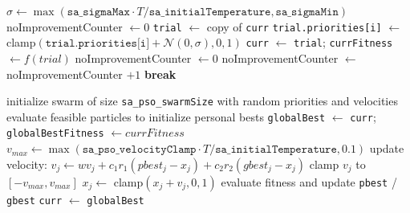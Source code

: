 \begin{algorithm}[H]
\caption{Normal Priority Refinement (SA)}
\begin{algorithmic}[1]
\State $\sigma \gets \max(\texttt{sa\_sigmaMax} \cdot T/\texttt{sa\_initialTemperature}, \texttt{sa\_sigmaMin})$
\State noImprovementCounter $\gets 0$
	\State \texttt{trial} $\gets$ copy of \texttt{curr}
		\State \texttt{trial.priorities[i]} $\gets$ clamp$(\texttt{trial.priorities[i]} + \mathcal{N}(0,\sigma), 0,1)$
	\EndFor
		\State \texttt{curr} $\gets$ \texttt{trial}; \texttt{currFitness} $\gets f(trial)$
		\State noImprovementCounter $\gets 0$
	\Else
		\State noImprovementCounter $\gets$ noImprovementCounter $+ 1$
	\EndIf
	 \State \textbf{break} \EndIf
\EndFor
\end{algorithmic}
\end{algorithm}

\begin{algorithm}[H]
\caption{PSO Priority Refinement (SA)}
\begin{algorithmic}[1]
\State initialize swarm of size \texttt{sa\_pso\_swarmSize} with random priorities and velocities
\State evaluate feasible particles to initialize personal bests
\State \texttt{globalBest} $\gets$ \texttt{curr}; \texttt{globalBestFitness} $\gets currFitness$
\State $v_{max} \gets \max(\texttt{sa\_pso\_velocityClamp} \cdot T/\texttt{sa\_initialTemperature}, 0.1)$
			\State update velocity:
			\State $v_j \gets w v_j + c_1 r_1(pbest_j - x_j) + c_2 r_2(gbest_j - x_j)$
			\State clamp $v_j$ to $[-v_{max}, v_{max}]$
			\State $x_j \gets$ clamp$(x_j + v_j, 0,1)$
		\EndFor
			\State evaluate fitness and update \texttt{pbest} / \texttt{gbest}
		\EndIf
	\EndFor
\EndFor
{}
	\State \texttt{curr} $\gets$ \texttt{globalBest}
\EndIf
\end{algorithmic}
\end{algorithm}